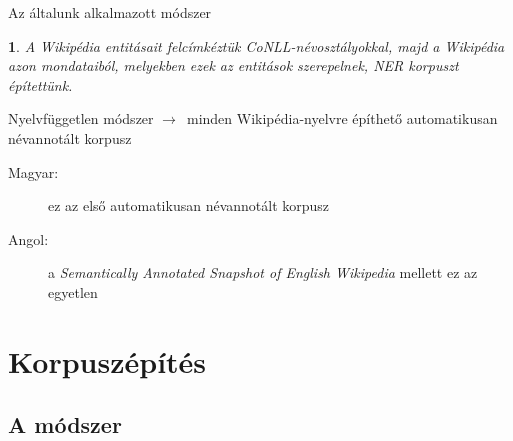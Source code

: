 \documentclass[utf8x,t]{beamer}
\newcommand{\nyil}{$\rightarrow$\ }
\newtheorem{nix}{}[section]
\begin{document}
%
%
%
%
%

\begin{frame}{Az általunk alkalmazott módszer}
\bigskip
\begin{nix}
A Wikipédia entitásait felcímkéztük CoNLL-névosztályokkal, majd a Wikipédia azon mondataiból,
melyekben ezek az entitások szerepelnek, NER korpuszt építettünk.
\end{nix}

\bigskip

Nyelvfüggetlen módszer \nyil minden Wikipédia-nyelvre építhető automatikusan névannotált korpusz

\bigskip

\begin{description}
\item[Magyar:] ez az első automatikusan névannotált korpusz
\item[Angol:] a \textit{Semantically Annotated Snapshot of English Wikipedia} mellett ez az egyetlen
\end{description}

\end{frame}

\section{Korpuszépítés}

\subsection*{A módszer}
\end{document}
